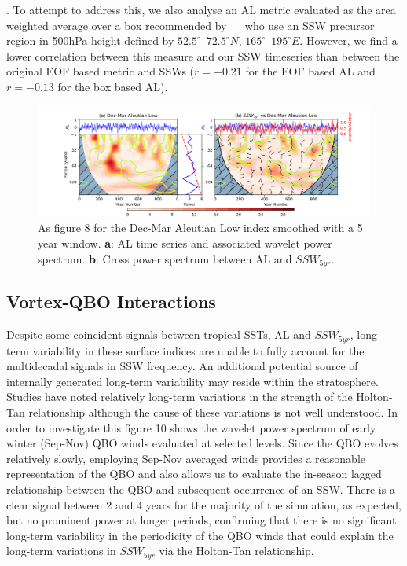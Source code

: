 \documentclass[wcd, manuscript]{copernicus}
\providecommand{\DIFaddend}{} %
\begin{document}
{{\citep{Woo2015}}\hspace{0pt}%
. To attempt to address this, we also analyse an AL metric evaluated as the area weighted average over a box recommended by \mbox{%
\cite{Garfinkel2012whymight} }\hspace{0pt}%
who use an SSW precursor region in 500hPa height defined by $52.5^{\circ}$–$72.5^{\circ}N$, $165^{\circ}$–$195^{\circ}E$. However, we find a lower correlation between this measure and our SSW timeseries than between the original EOF based metric and SSWs ($r = -0.21$ for the EOF based AL and $r = -0.13$ for the box based AL).
}\DIFaddend 


\begin{center}
\begin{figure}[h!]
\includegraphics[width = \linewidth]{new_changed_figures/AL_wavelet_combined_new_levels.png}
\caption{As figure 8 for the Dec-Mar Aleutian Low index smoothed with a 5 year window. \textbf{a}: AL time series and associated wavelet power spectrum. \textbf{b}: Cross power spectrum between AL and $SSW_{5yr}$.}
\end{figure}
\end{center}



\subsection{Vortex-QBO Interactions}
Despite some coincident signals between tropical SSTs, AL and $SSW_{5yr}$, long-term variability in these surface indices are unable to fully account for the  multidecadal signals in SSW frequency. An additional potential source of internally generated long-term variability may reside within the stratosphere. Studies have noted relatively long-term variations in the strength of the Holton-Tan relationship \citep{Lu2008, Lu14, OspEA10} although the cause of these variations is not well understood. In order to investigate this figure 10 shows the wavelet power spectrum of early winter (Sep-Nov) QBO winds evaluated at selected levels. Since the QBO evolves relatively slowly, employing Sep-Nov averaged winds provides a reasonable representation of the QBO and also allows us to evaluate the in-season lagged relationship between the QBO and subsequent occurrence of an SSW. There is a clear signal between 2 and 4 years for the majority of the simulation, as expected, but no prominent power at longer periods,  confirming that there is no significant long-term variability in the periodicity of the QBO winds that could explain the long-term variations in $SSW_{5yr}$ via the Holton-Tan relationship.
\end{document}
